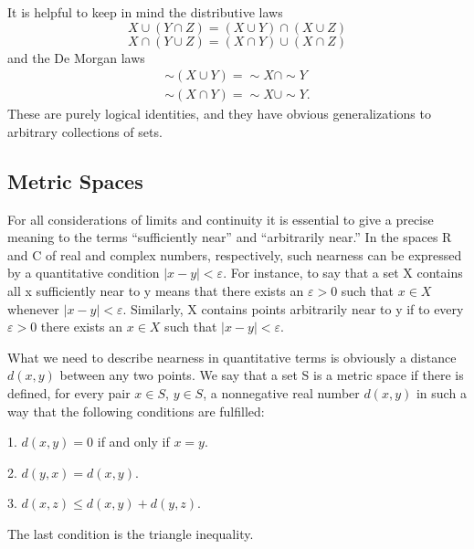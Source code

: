 It is helpful to keep in mind the distributive laws
\begin{equation*}
X \cup (Y \cap Z) = (X \cup Y) \cap (X \cup Z)
\end{equation*}
\begin{equation*}
X \cap (Y \cup Z) = (X \cap Y) \cup (X \cap Z)
\end{equation*}
and the De Morgan laws
\begin{equation*}
\begin{array}{l} \sim (X \cup Y) = \sim X \cap \sim Y \\ \sim (X \cap Y) = \sim X \cup \sim Y. \end{array}
\end{equation*}
These are purely logical identities, and they have obvious generalizations to arbitrary collections of sets.

\setcounter{section}{1}\setcounter{subsection}{1}\subsection{Metric Spaces}\label{sec:3.1.2}
For all considerations of limits and continuity it is essential to give a precise meaning to the terms “sufficiently near” and “arbitrarily near.” In the spaces R and C of real and complex numbers, respectively, such nearness can be expressed by a quantitative condition $|x - y| < \varepsilon$. For instance, to say that a set X contains all x sufficiently near to y means that there exists an $\varepsilon > 0$ such that $x \in X$ whenever $|x - y| < \varepsilon$. Similarly, X contains points arbitrarily near to y if to every $\varepsilon > 0$ there exists an $x \in X$ such that $|x - y| < \varepsilon$.

What we need to describe nearness in quantitative terms is obviously a distance $d(x,y)$ between any two points. We say that a set S is a metric space if there is defined, for every pair $x \in S$, $y \in S$, a nonnegative real number $d(x,y)$ in such a way that the following conditions are fulfilled:

1. $d(x,y) = 0$ if and only if $x = y$.

2. $d(y,x) = d(x,y)$.

3. $d(x,z)\leq d(x,y) + d(y,z).$

The last condition is the triangle inequality.

